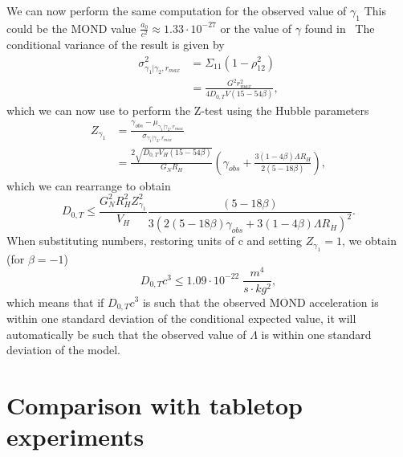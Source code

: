 \documentclass[aps,pra,amsmath,amssymb,amsthm,floatfix,nofootinbib,notitlepage,superscriptaddress,10pt]{revtex4-2}
\begin{document}
We can now perform the same computation for the observed value of $\gamma_1$ This could be the MOND value $\frac{a_0}{c^2}\approx 1.33\cdot 10^{-27}$ or the value of $\gamma$ found in~\cite{mannheim2012fitting}
The conditional variance of the result is given by
\begin{equation}
	\label{eq: Cond_variance}
	\begin{split}
		\sigma^2_{\gamma_1|\gamma_2,r_{max}}&=\Sigma_{11}(1-\rho_{12}^2) \\
		&=\frac{G^2 r_{max}^2}{4  D_{0,T} V(15 -54\beta)},
	\end{split}
\end{equation}
which we can now use to perform the Z-test using the Hubble parameters
\begin{equation}
	\label{eq: gamma1_Ztest}
	\begin{split}
		Z_{\gamma_1} &= \frac{\gamma_{obs}-\mu_{\gamma_1|\gamma_2,r_{max}}}{\sigma_{\gamma_1|\gamma_2,r_{max}}}\\
		&=\frac{2 \sqrt{ D_{0,T} V_H(15-54\beta)}}{G_N R_H} \left(\gamma_{obs}+\frac{3 (1-4\beta) \Lambda  R_H}{2(5-18\beta)}\right),
	\end{split}
\end{equation}
which we can rearrange to obtain
\begin{equation}
	D_{0,T}\leq\frac{G_N^2 R_H^2 Z_{\gamma_1}^2}{V_H}\frac{(5-18\beta) }{3  (2 (5-18\beta) \gamma_{obs}+3 (1-4\beta) \Lambda  R_H)^2}.
\end{equation}
When substituting numbers, restoring units of c and setting $Z_{\gamma_1}=1$, we obtain (for $\beta=-1$)
\begin{equation}
	D_{0,T}c^3 \leq 1.09\cdot 10^{-22} \; \frac{m^4}{s\cdot kg^2},
	\label{eq:D0T-cosmo}
\end{equation}
which means that if $D_{0,T}c^3$ is such that the observed MOND acceleration is within one standard deviation of the conditional expected value, it will automatically be such that the observed value of $\Lambda$ is within one standard deviation of the model.


\section{Comparison with tabletop experiments}
\label{sec:comparison}
\end{document}
